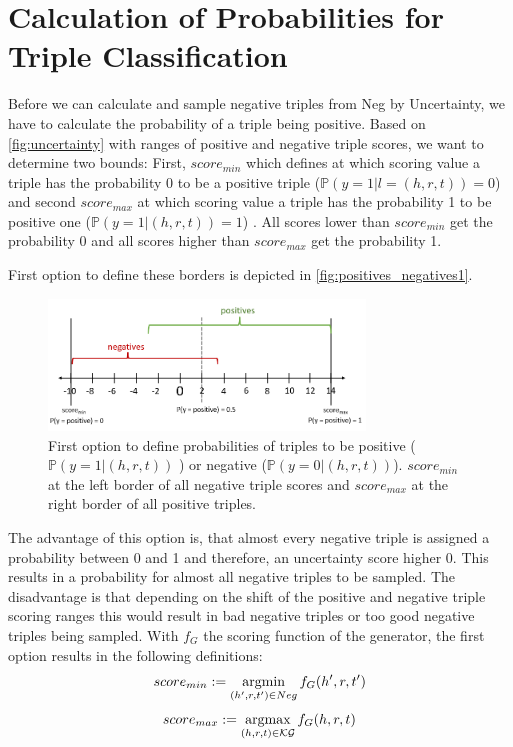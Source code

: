 \section{Calculation of Probabilities for Triple Classification}
\label{sec:calculation_of_probabilitie_for_triple_Classification}
Before we can calculate and sample negative triples from Neg by Uncertainty, we have to calculate the probability of a triple being positive.
Based on \autoref{fig:uncertainty} with ranges of positive and negative triple scores, we want to determine two bounds: 
First, $score_{min}$ which defines at which scoring value a triple has the probability 0 to be a positive triple ($\mathds{P}(y = 1 | l = (h,r,t)) = 0$) and second $score_{max}$ at which scoring value a triple has the probability 1 to be positive one ($\mathds{P}(y = 1 | (h,r,t)) = 1$) . 
All scores lower than $score_{min}$ get the probability 0 and all scores higher than $score_{max}$ get the probability 1.

First option to define these borders is depicted in \autoref{fig:positives_negatives1}.
\begin{figure}[t]
  \centering
    \includegraphics[width=0.75\textwidth]{figures/positives_negatives1.PNG}
  \caption{First option to define probabilities of triples to be positive ($\mathds{P}(y = 1 | (h,r,t))$ ) or negative ($\mathds{P}(y = 0 | (h,r,t))$). 
  $score_{min}$ at the left border of all negative triple scores and $score_{max}$ at the right border of all positive triples.}
  \label{fig:positives_negatives1}
\end{figure}
The advantage of this option is, that almost every negative triple is assigned a probability between 0 and 1 and therefore, an uncertainty score higher 0.
This results in a probability for almost all negative triples to be sampled.
The disadvantage is that depending on the shift of the positive and negative triple scoring ranges this would result in bad negative triples or too good negative triples being sampled.
With $f_G$ the scoring function of the generator, the first option results in the following definitions:
\begin{equation} \label{eqn:opt1_score_min}
    score_{min} := \operatorname*{argmin}_{(h',r,t') \in Neg}{f_G(h',r,t')}
\end{equation}
\begin{equation} \label{eqn:opt1_score_max}
    score_{max} := \operatorname*{argmax}_{(h,r,t) \in \mathcal{KG}}{f_G(h,r,t)}
\end{equation}

